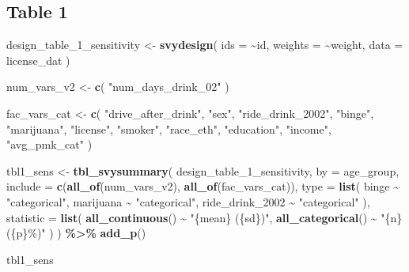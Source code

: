 \documentclass[
]{article}
\newenvironment{Shaded}{\begin{snugshade}}{\end{snugshade}}
\newcommand{\AttributeTok}[1]{\textcolor[rgb]{0.13,0.29,0.53}{#1}}
\newcommand{\FunctionTok}[1]{\textcolor[rgb]{0.13,0.29,0.53}{\textbf{#1}}}
\newcommand{\NormalTok}[1]{#1}
\newcommand{\OtherTok}[1]{\textcolor[rgb]{0.56,0.35,0.01}{#1}}
\newcommand{\SpecialCharTok}[1]{\textcolor[rgb]{0.81,0.36,0.00}{\textbf{#1}}}
\newcommand{\StringTok}[1]{\textcolor[rgb]{0.31,0.60,0.02}{#1}}
\begin{document}
\subsection{Table 1}\label{table-1-1}

\begin{Shaded}
\begin{Highlighting}[]
\NormalTok{design\_table\_1\_sensitivity }\OtherTok{\textless{}{-}} \FunctionTok{svydesign}\NormalTok{(}
  \AttributeTok{ids =} \SpecialCharTok{\textasciitilde{}}\NormalTok{id,}
  \AttributeTok{weights =} \SpecialCharTok{\textasciitilde{}}\NormalTok{weight,}
  \AttributeTok{data =}\NormalTok{ license\_dat}
\NormalTok{)}

\NormalTok{num\_vars\_v2 }\OtherTok{\textless{}{-}} \FunctionTok{c}\NormalTok{(}
  \StringTok{"num\_days\_drink\_02"}
\NormalTok{)}

\NormalTok{fac\_vars\_cat }\OtherTok{\textless{}{-}} \FunctionTok{c}\NormalTok{(}
  \StringTok{"drive\_after\_drink"}\NormalTok{, }\StringTok{"sex"}\NormalTok{,}
  \StringTok{"ride\_drink\_2002"}\NormalTok{, }\StringTok{"binge"}\NormalTok{, }\StringTok{"marijuana"}\NormalTok{,}
  \StringTok{"license"}\NormalTok{, }\StringTok{"smoker"}\NormalTok{, }\StringTok{"race\_eth"}\NormalTok{, }\StringTok{"education"}\NormalTok{, }\StringTok{"income"}\NormalTok{,}
  \StringTok{"avg\_pmk\_cat"}
\NormalTok{) }

\NormalTok{tbl1\_sens }\OtherTok{\textless{}{-}} \FunctionTok{tbl\_svysummary}\NormalTok{(}
\NormalTok{  design\_table\_1\_sensitivity,}
  \AttributeTok{by =}\NormalTok{ age\_group,}
  \AttributeTok{include =} \FunctionTok{c}\NormalTok{(}\FunctionTok{all\_of}\NormalTok{(num\_vars\_v2), }\FunctionTok{all\_of}\NormalTok{(fac\_vars\_cat)),}
  \AttributeTok{type =} \FunctionTok{list}\NormalTok{(}
\NormalTok{    binge }\SpecialCharTok{\textasciitilde{}} \StringTok{"categorical"}\NormalTok{,}
\NormalTok{    marijuana }\SpecialCharTok{\textasciitilde{}} \StringTok{"categorical"}\NormalTok{,}
\NormalTok{    ride\_drink\_2002 }\SpecialCharTok{\textasciitilde{}} \StringTok{"categorical"}
\NormalTok{  ),}
  \AttributeTok{statistic =} \FunctionTok{list}\NormalTok{(}
    \FunctionTok{all\_continuous}\NormalTok{() }\SpecialCharTok{\textasciitilde{}} \StringTok{"\{mean\} (\{sd\})"}\NormalTok{,}
    \FunctionTok{all\_categorical}\NormalTok{() }\SpecialCharTok{\textasciitilde{}} \StringTok{"\{n\} (\{p\}\%)"}
\NormalTok{  )}
\NormalTok{) }\SpecialCharTok{\%\textgreater{}\%}
  \FunctionTok{add\_p}\NormalTok{() }

\NormalTok{tbl1\_sens}
\end{Highlighting}
\end{Shaded}
\end{document}
